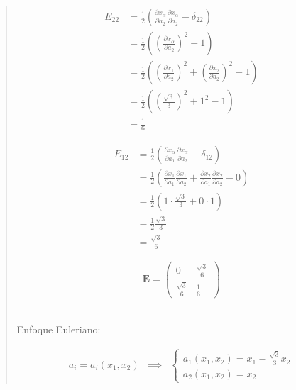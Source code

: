 \documentclass[a4paper,10pt,twoside,final,spanish]{article}
\begin{document}
\begin{quote}
\begin{minipage}{0.5\linewidth}
\end{minipage} \hfill \begin{minipage}{0.5\linewidth}

\begin{align*}
E_{22} &=
\frac{1}{2}\left(
\frac{\partial x_{\alpha}}{\partial a_{2}}
\frac{\partial x_{\alpha}}{\partial a_{2}}-\delta_{22}
\right) \\
&=
\frac{1}{2}\left(
\left(\frac{\partial x_{\alpha}}{\partial a_{2}}\right)^{2}-1
\right) \\
&=
\frac{1}{2}\left(
\left(\frac{\partial x_{1}}{\partial a_{2}}\right)^{2}
+\left(\frac{\partial x_{2}}{\partial a_{2}}\right)^{2}-1
\right) \\
&=
\frac{1}{2}\left(\left(\frac{\sqrt{3}}{3}\right)^{2}+1^{2}-1\right) \\
&= \frac{1}{6}
\end{align*}

\end{minipage}

\begin{minipage}{0.5\linewidth}

\begin{align*}
E_{12} &=
\frac{1}{2}\left(
\frac{\partial x_{\alpha}}{\partial a_{1}}
\frac{\partial x_{\alpha}}{\partial a_{2}}-\delta_{12}
\right) \\
&=
\frac{1}{2}\left(
\frac{\partial x_{1}}{\partial a_{1}}
\frac{\partial x_{1}}{\partial a_{2}}
+\frac{\partial x_{2}}{\partial a_{1}}
\frac{\partial x_{2}}{\partial a_{2}}
-0
\right) \\
&=
\frac{1}{2}\left(
1\cdot
\frac{\sqrt{3}}{3}
+0\cdot
1
\right) \\
&=
\frac{1}{2}\frac{\sqrt{3}}{3} \\
&=\frac{\sqrt{3}}{6}
\end{align*}

\end{minipage} \hfill \begin{minipage}{0.5\linewidth}

\[
\mathbf{E}=
\begin{pmatrix}
0                  & \frac{\sqrt{3}}{6} \\
\frac{\sqrt{3}}{6} & \frac{1}{6}
\end{pmatrix}
\]

\end{minipage} \\

Enfoque Euleriano:

\[
\begin{array}{ccc}
a_{i}=a_{i}(x_{1},x_{2}) & \implies & \left\{\begin{array}{l}
 								   a_{1}(x_{1},x_{2})=x_{1}-\frac{\sqrt{3}}{3}x_{2} \\
   								   a_{2}(x_{1},x_{2})=x_{2}
   								   \end{array}\right.
\end{array}
\]


\end{quote}
\end{document}
